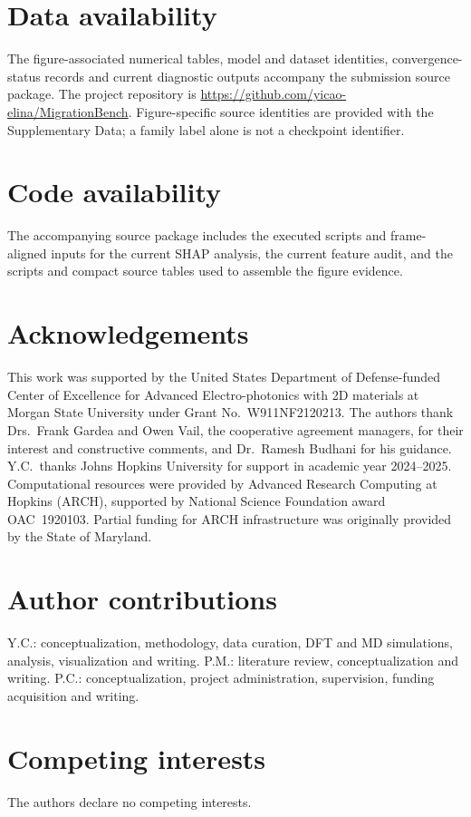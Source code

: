 \documentclass[pdflatex,sn-mathphys-num]{sn-jnl}
\newif\ifreviewcopy
\newcommand{\rev}[2]{\ifreviewcopy{\color{revisionblue}#2\textsuperscript{\scriptsize[R1-#1]}}\else#2\fi}
\begin{document}
\section*{Data availability}
The figure-associated numerical tables, model and dataset identities, convergence-status records and current diagnostic outputs accompany the submission source package. The project repository is \url{https://github.com/yicao-elina/MigrationBench}. Figure-specific source identities are provided with the Supplementary Data; a family label alone is not a checkpoint identifier.
\section*{Code availability}
\rev{C13}{The accompanying source package includes the executed scripts and frame-aligned inputs for the current SHAP analysis, the current feature audit, and the scripts and compact source tables used to assemble the figure evidence.}
\section*{Acknowledgements}
This work was supported by the United States Department of Defense-funded Center of Excellence for Advanced Electro-photonics with 2D materials at Morgan State University under Grant No.~W911NF2120213. The authors thank Drs.~Frank Gardea and Owen Vail, the cooperative agreement managers, for their interest and constructive comments, and Dr.~Ramesh Budhani for his guidance. Y.C.\ thanks Johns Hopkins University for support in academic year 2024--2025. Computational resources were provided by Advanced Research Computing at Hopkins (ARCH), supported by National Science Foundation award OAC~1920103. Partial funding for ARCH infrastructure was originally provided by the State of Maryland.
\section*{Author contributions}
Y.C.: conceptualization, methodology, data curation, DFT and MD simulations, analysis, visualization and writing. P.M.: literature review, conceptualization and writing. P.C.: conceptualization, project administration, supervision, funding acquisition and writing.
\section*{Competing interests}
The authors declare no competing interests.

\end{document}
